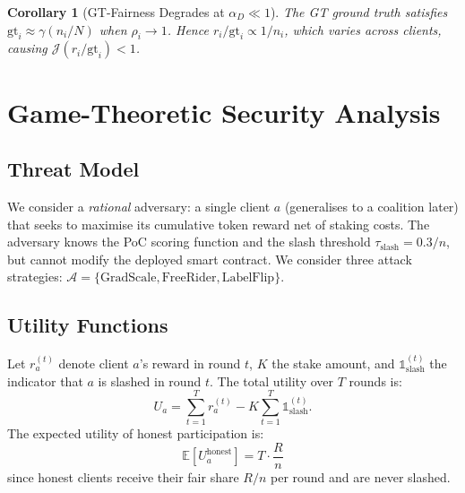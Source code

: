 \documentclass[journal]{IEEEtran}
\newtheorem{corollary}[theorem]{Corollary}
\theoremstyle{definition}
\theoremstyle{remark}
\begin{document}
\begin{corollary}[GT-Fairness Degrades at $\alpha_D \ll 1$]
\label{cor:degrade}
The GT ground truth satisfies $\mathrm{gt}_i \approx \gamma (n_i/N)$
when $\rho_i \to 1$.
Hence $r_i / \mathrm{gt}_i \propto 1/n_i$, which varies across
clients, causing $\mathcal{J}(r_i/\mathrm{gt}_i) < 1$.
\end{corollary}

\section{Game-Theoretic Security Analysis}
\label{sec:gametheory}

\subsection{Threat Model}

We consider a \emph{rational} adversary: a single client $a$
(generalises to a coalition later) that seeks to maximise its
cumulative token reward net of staking costs.
The adversary knows the PoC scoring function and the slash
threshold $\tau_{\mathrm{slash}} = 0.3/n$, but cannot modify
the deployed smart contract.
We consider three attack strategies:
$\mathcal{A} = \{\mathrm{GradScale}, \mathrm{FreeRider},
\mathrm{LabelFlip}\}$.

\subsection{Utility Functions}

Let $r_a^{(t)}$ denote client $a$'s reward in round $t$,
$K$ the stake amount, and $\mathbb{1}_{\mathrm{slash}}^{(t)}$ the
indicator that $a$ is slashed in round $t$.
The total utility over $T$ rounds is:
\begin{equation}
  U_a = \sum_{t=1}^{T} r_a^{(t)}
        - K \sum_{t=1}^{T} \mathbb{1}_{\mathrm{slash}}^{(t)}.
  \label{eq:utility}
\end{equation}
The expected utility of honest participation is:
\begin{equation}
  \mathbb{E}[U_a^{\mathrm{honest}}]
  = T \cdot \frac{R}{n}
  \label{eq:honest_utility}
\end{equation}
since honest clients receive their fair share $R/n$ per round
and are never slashed.
\end{document}
